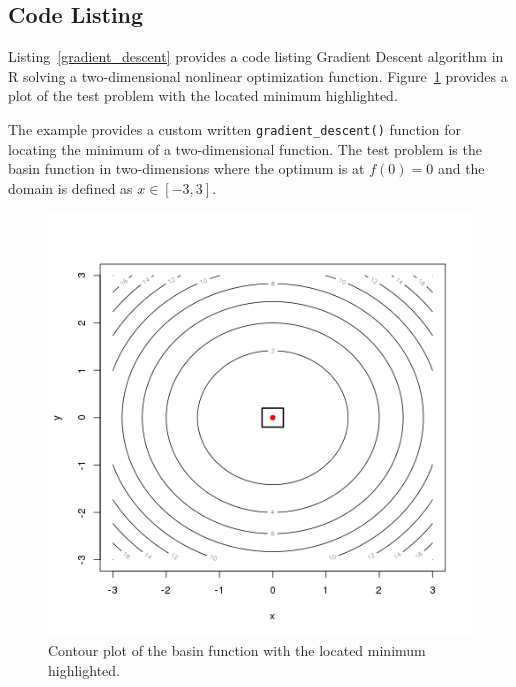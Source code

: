 \subsection{Code Listing}
Listing~\ref{gradient_descent} provides a code listing Gradient Descent algorithm in R solving a two-dimensional nonlinear optimization function. Figure~\ref{plot:gradient_descent_result} provides a plot of the test problem with the located minimum highlighted.

The example provides a custom written \texttt{gradient\_descent()} function for locating the minimum of a two-dimensional function.
The test problem is the basin function in two-dimensions where the optimum is at $f(0)=0$ and the domain is defined as $x \in [-3,3]$. 



\begin{figure}[htp]
\centering
\includegraphics[scale=0.45]{book/a_optimization/gradient_descent_result.png}
\caption{Contour plot of the basin function with the located minimum highlighted.}
\label{plot:gradient_descent_result}
\end{figure}


